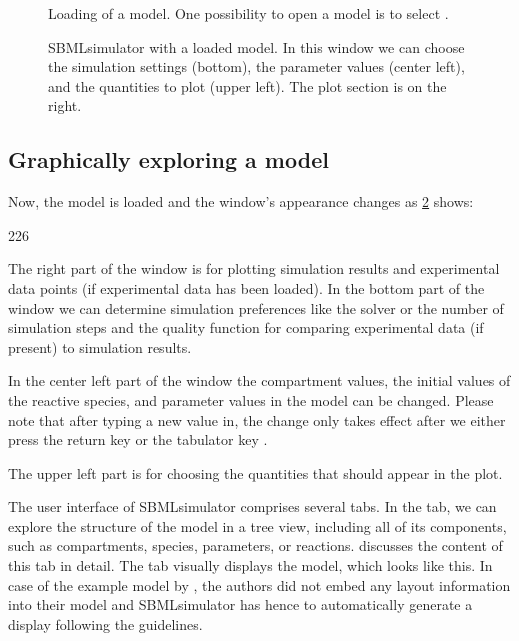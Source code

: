 \begin{figure}[t]
\centering
{}
\caption[Loading of a model]{Loading of a model.
One possibility to open a model is to select .}
\label{fig:openModel}
\end{figure}
\begin{figure}[t]
\centering
{}
\caption[SBMLsimulator with a loaded model]{SBMLsimulator with a loaded model.
In this window we can choose the simulation settings (bottom), the parameter values (center left), and the quantities to plot (upper left).
The plot section is on the right.}
\label{fig:modelOpened}
\end{figure}

\subsection{Graphically exploring a model}
\label{sec:ModelTree}

Now, the model is loaded and the window's appearance changes as \cref{fig:modelOpened} shows:
\begin{dinglist}{226}
  \item The right part of the window is for plotting simulation results and experimental data points (if experimental data has been loaded).
In the bottom part of the window we can determine simulation preferences like the solver or the number of simulation steps and the quality function for comparing experimental data (if present) to simulation results.
  \item In the center left part of the window the compartment values, the initial values of the reactive species, and parameter values in the model can be changed.
  Please note that after typing a new value in, the change only takes effect after we either press the return key \keys{\return} or the tabulator key \keys{\tab}.
  \item The upper left part is for choosing the quantities that should appear in the plot.
\end{dinglist}
The user interface of SBMLsimulator comprises several tabs.
In the  tab, we can explore the structure of the model in a tree view, including all of its components, such as compartments, species, parameters, or reactions.
 discusses the content of this tab in detail.
The  tab visually displays the model, which looks like this.
In case of the example model by \citeauthor{Bucher2011}, the authors did not embed any layout information into their model and SBMLsimulator has hence to automatically generate a display following the \SBGN guidelines.

